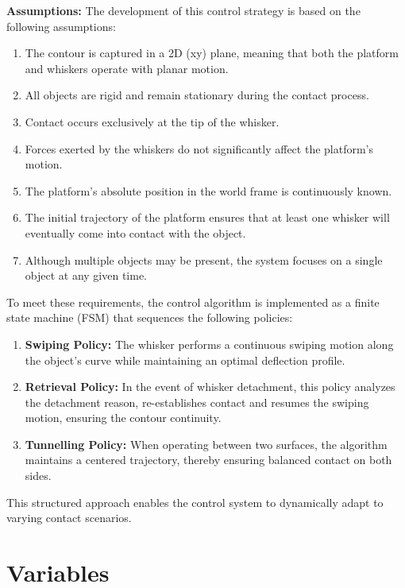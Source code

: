 \noindent \textbf{Assumptions:} The development of this control strategy is based on the following assumptions:
\begin{enumerate}
    \item The contour is captured in a 2D (xy) plane, meaning that both the platform and whiskers operate with planar motion.
    \item All objects are rigid and remain stationary during the contact process.
    \item Contact occurs exclusively at the tip of the whisker.
    \item Forces exerted by the whiskers do not significantly affect the platform's motion.
    \item The platform's absolute position in the world frame is continuously known.
    \item The initial trajectory of the platform ensures that at least one whisker will eventually come into contact with the object.
    \item Although multiple objects may be present, the system focuses on a single object at any given time.
\end{enumerate}

\noindent To meet these requirements, the control algorithm is implemented as a finite state machine (FSM) that sequences the following policies:

\begin{enumerate}
    \item \textbf{Swiping Policy:} The whisker performs a continuous swiping motion along the object's curve while maintaining an optimal deflection profile.
    \item \textbf{Retrieval Policy:} In the event of whisker detachment, this policy analyzes the detachment reason, re-establishes contact and resumes the swiping motion, ensuring the contour continuity.
    \item \textbf{Tunnelling Policy:} When operating between two surfaces, the algorithm maintains a centered trajectory, thereby ensuring balanced contact on both sides.
\end{enumerate}

This structured approach enables the control system to dynamically adapt to varying contact scenarios.


\section{Variables}

